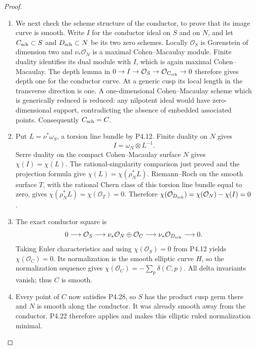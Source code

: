 \begin{proof}
\begin{enumerate}[label={$\langle1\rangle$\arabic*.},leftmargin=*]
\item We next check the scheme structure
of the conductor, to prove that
its image curve is smooth.
Write $I$ for the conductor ideal
on $S$ and on $N$, and let
$C_{\rm sch}\subset S$ and
$D_{\rm sch}\subset N$ be its
two zero schemes. Locally
$\mathcal O_S$ is Gorenstein
of dimension two and
$\nu_*\mathcal O_N$ is a
maximal Cohen--Macaulay module.
Finite duality identifies
its dual module with $I$,
which is again maximal
Cohen--Macaulay. The depth
lemma in
$0\to I\to\mathcal O_S
\to\mathcal O_{C_{\rm sch}}\to0$
therefore gives depth one
for the conductor curve.
At a generic cusp its local
length in the transverse
direction is one. A
one-dimensional Cohen--Macaulay
scheme which is generically
reduced is reduced: any
nilpotent ideal would have
zero-dimensional support,
contradicting the absence of
embedded associated points.
Consequently $C_{\rm sch}=C$.

\item Put $L=\nu^*\omega_S$, a
torsion line bundle by P4.12.
Finite duality on $N$ gives
\[
 I=\omega_N\otimes L^{-1}.
\]
Serre duality on the compact
Cohen--Macaulay surface $N$
gives $\chi(I)=\chi(L)$.
The rational-singularity
comparison just proved and
the projection formula give
$\chi(L)=\chi(\rho_N^*L)$.
Riemann--Roch on the smooth
surface $T$, with the rational
Chern class of this torsion
line bundle equal to zero,
gives $\chi(\rho_N^*L)
=\chi(\mathcal O_T)=0$.
Therefore
$\chi(\mathcal O_{D_{\rm sch}})
=\chi(\mathcal O_N)-\chi(I)=0$.

\item The exact conductor square is
\[
 0\longrightarrow\mathcal O_S
 \longrightarrow
 \nu_*\mathcal O_N\oplus\mathcal O_C
 \longrightarrow\nu_*\mathcal O_{D_{\rm sch}}
 \longrightarrow0.
\]
Taking Euler characteristics and
using $\chi(\mathcal O_S)=0$
from P4.12 yields
$\chi(\mathcal O_C)=0$.
Its normalization is the
smooth elliptic curve $H$,
so the normalization sequence
gives $\chi(\mathcal O_C)
 =-\sum_p\delta(C,p)$.
All delta invariants vanish;
thus $C$ is smooth.

\item Every point of $C$ now satisfies
P4.28, so $S$ has the product
cusp germ there and $N$ is
smooth along the conductor.
It was already smooth away
from the conductor. P4.22
therefore applies and makes
this elliptic ruled
normalization minimal.

\end{enumerate}
\end{proof}
